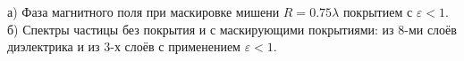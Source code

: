 \documentclass[14pt]{beamer}
\begin{document}
\begin{frame}
\begin{center}
\small
  \begin{minipage}[ht]{0.55\linewidth}
  \end{minipage}
  \begin{minipage}[ht]{0.43\linewidth}
  \end{minipage}
  а) Фаза магнитного поля при маскировке мишени ${R = 0.75\lambda}$
  покрытием с ${\varepsilon<1}$. б) Спектры частицы без покрытия и с маскирующими
    покрытиями: из 8-ми слоёв диэлектрика и из 3-х слоёв с применением
    ${\varepsilon<1}$.
\end{center}
\end{frame}
\end{document}
